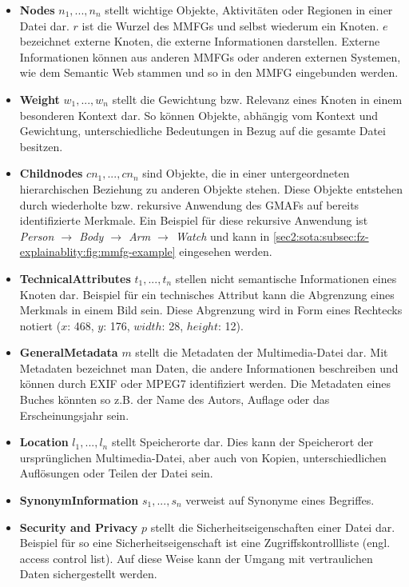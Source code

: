 \begin{itemize}
    \item \textbf{Nodes} $n_{1},...,n_{n}$ stellt wichtige Objekte, Aktivitäten oder Regionen in einer Datei dar.
    $r$ ist die Wurzel des MMFGs und selbst wiederum ein Knoten.
    $e$ bezeichnet externe Knoten, die externe Informationen darstellen.
    Externe Informationen können aus anderen MMFGs oder anderen externen Systemen, wie dem Semantic Web stammen und so in den MMFG eingebunden werden.
    \item \textbf{Weight} $w_{1},...,w_{n}$ stellt die Gewichtung bzw. Relevanz eines Knoten in einem besonderen Kontext dar.
    So können Objekte, abhängig vom Kontext und Gewichtung, unterschiedliche Bedeutungen in Bezug auf die gesamte Datei besitzen.
    \item \textbf{Childnodes} $cn_{1},...,cn_{n}$ sind Objekte, die in einer untergeordneten hierarchischen Beziehung zu anderen Objekte stehen.
    Diese Objekte entstehen durch wiederholte bzw. rekursive Anwendung des GMAFs auf bereits identifizierte Merkmale.
    Ein Beispiel für diese rekursive Anwendung ist \textit{Person $\rightarrow$ Body $\rightarrow$ Arm $\rightarrow$ Watch} und kann in \cref{sec2:sota:subsec:fz-explainablity:fig:mmfg-example} eingesehen werden.
    \item \textbf{TechnicalAttributes} $t_{1},...,t_{n}$ stellen nicht semantische Informationen eines Knoten dar.
    Beispiel für ein technisches Attribut kann die Abgrenzung eines Merkmals in einem Bild sein.
    Diese Abgrenzung wird in Form eines Rechtecks notiert ($x$: 468, $y$: 176, $width$: 28, $height$: 12).
    \item \textbf{GeneralMetadata} $m$ stellt die Metadaten der Multimedia-Datei dar.
    Mit Metadaten bezeichnet man Daten, die andere Informationen beschreiben und können durch EXIF oder MPEG7 identifiziert werden.
    Die Metadaten eines Buches könnten so z.B. der Name des Autors, Auflage oder das Erscheinungsjahr sein.
    \item \textbf{Location} $l_{1},...,l_{n}$ stellt Speicherorte dar.
    Dies kann der Speicherort der ursprünglichen Multimedia-Datei, aber auch von Kopien, unterschiedlichen Auflösungen oder Teilen der Datei sein.
    \item \textbf{SynonymInformation} $s_{1},...,s_{n}$ verweist auf Synonyme eines Begriffes.
    \item \textbf{Security and Privacy} $p$ stellt die Sicherheitseigenschaften einer Datei dar.
    Beispiel für so eine Sicherheitseigenschaft ist eine Zugriffskontrollliste (engl. access control list).
    Auf diese Weise kann der Umgang mit vertraulichen Daten sichergestellt werden.
\end{itemize}
